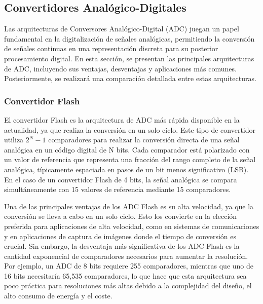    


  \subsection{Convertidores Analógico-Digitales}


Las arquitecturas de Conversores Analógico-Digital (ADC) juegan un papel fundamental en la digitalización de señales analógicas, permitiendo la conversión de señales continuas en una representación discreta para su posterior procesamiento digital. En esta sección, se presentan las principales arquitecturas de ADC, incluyendo sus ventajas, desventajas y aplicaciones más comunes. Posteriormente, se realizará una comparación detallada entre estas arquitecturas.


\subsubsection{Convertidor Flash}

El convertidor Flash es la arquitectura de ADC más rápida disponible en la actualidad, ya que realiza la conversión en un solo ciclo. Este tipo de convertidor utiliza $2^{N}-1$ comparadores para realizar la conversión directa de una señal analógica en un código digital de N bits. Cada comparador está polarizado con un valor de referencia que representa una fracción del rango completo de la señal analógica, típicamente espaciada en pasos de un bit menos significativo (LSB). En el caso de un convertidor Flash de 4 bits, la señal analógica se compara simultáneamente con 15 valores de referencia mediante 15 comparadores.

Una de las principales ventajas de los ADC Flash es su alta velocidad, ya que la conversión se lleva a cabo en un solo ciclo. Esto los convierte en la elección preferida para aplicaciones de alta velocidad, como en sistemas de comunicaciones y en aplicaciones de captura de imágenes  donde el tiempo de conversión es crucial. Sin embargo, la desventaja más significativa de los ADC Flash es la cantidad exponencial de comparadores necesarios para aumentar la resolución. Por ejemplo, un ADC de 8 bits requiere 255 comparadores, mientras que uno de 16 bits necesitaría 65,535 comparadores, lo que hace que esta arquitectura sea poco práctica para resoluciones más altas debido a la complejidad del diseño, el alto consumo de energía y el coste.

